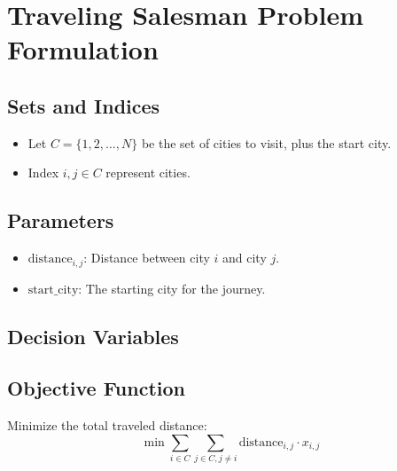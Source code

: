 \documentclass{article}
\begin{document}
\section*{Traveling Salesman Problem Formulation}

\subsection*{Sets and Indices}
\begin{itemize}
    \item Let \( C = \{1, 2, \ldots, N\} \) be the set of cities to visit, plus the start city.
    \item Index \( i, j \in C \) represent cities.
\end{itemize}

\subsection*{Parameters}
\begin{itemize}
    \item \( \text{distance}_{i,j} \): Distance between city \( i \) and city \( j \).
    \item \( \text{start\_city} \): The starting city for the journey.
\end{itemize}

\subsection*{Decision Variables}

\subsection*{Objective Function}
Minimize the total traveled distance:
\[
\min \sum_{i \in C} \sum_{j \in C, j \neq i} \text{distance}_{i,j} \cdot x_{i,j}
\]
\end{document}
